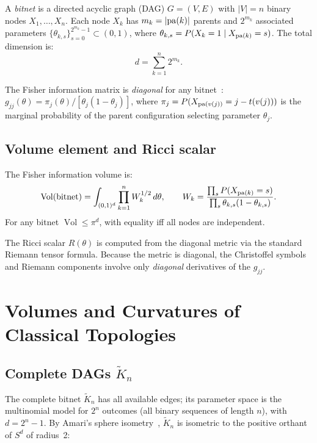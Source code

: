 \documentclass[11pt]{article}
\theoremstyle{definition}
\DeclareMathOperator{\Vol}{Vol}
\begin{document}
A \emph{bitnet} is a directed acyclic graph (DAG) $G=(V,E)$ with $|V|=n$ 
binary nodes $X_1,\ldots,X_n$.  Each node $X_k$ has $m_k = |{\rm pa}(k)|$ 
parents and $2^{m_k}$ associated parameters 
$\{\theta_{k,s}\}_{s=0}^{2^{m_k}-1} \subset (0,1)$, where 
$\theta_{k,s} = P(X_k=1 \mid X_{{\rm pa}(k)} = s)$.  The total dimension is:
\[
  d = \sum_{k=1}^n 2^{m_k}.
\]

The Fisher information matrix is \emph{diagonal} for any bitnet~\cite{Rod04}: 
$g_{jj}(\theta) = \pi_j(\theta)/[\theta_j(1-\theta_j)]$, where 
$\pi_j = P(X_{{\rm pa}(v(j))} = j - t(v(j)))$ is the marginal probability of 
the parent configuration selecting parameter $\theta_j$.

\subsection{Volume element and Ricci scalar}

The Fisher information volume is:
\begin{equation}\label{eq:vol}
  \Vol(\text{bitnet}) = \int_{(0,1)^d} \prod_{k=1}^n W_k^{1/2}\,d\theta,
  \qquad
  W_k = \frac{\prod_s P(X_{{\rm pa}(k)}=s)}{\prod_s \theta_{k,s}(1-\theta_{k,s})}.
\end{equation}
For any bitnet $\Vol \leq \pi^d$, with equality iff all nodes are independent.

The Ricci scalar $R(\theta)$ is computed from the diagonal metric via the 
standard Riemann tensor formula.  Because the metric is diagonal, the 
Christoffel symbols and Riemann components involve only \emph{diagonal} 
derivatives of the $g_{jj}$.

\section{Volumes and Curvatures of Classical Topologies}

\subsection{Complete DAGs $\tilde{K}_n$}\label{sec:Kn}

The complete bitnet $\tilde{K}_n$ has all available edges; its parameter 
space is the multinomial model for $2^n$ outcomes (all binary sequences 
of length $n$), with $d = 2^n-1$.  By Amari's sphere isometry~\cite{AS85}, 
$\tilde{K}_n$ is isometric to the positive orthant of $S^{d}$ of radius~2:
\end{document}
